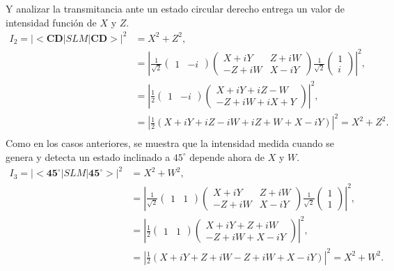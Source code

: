 Y analizar la transmitancia ante un estado circular derecho entrega un
valor de intensidad función de $X$ y $Z$.
\begin{align*}
I_2 = |<\mathbf{CD}|SLM|\mathbf{CD}>|^2 &= X^2+Z^2,\\
&=  \left|\frac{1}{\sqrt{2}}\begin{pmatrix} 1&-i\end{pmatrix} 
       \begin{pmatrix}
         X+iY & Z+iW \\-Z+iW & X-iY
       \end{pmatrix} \frac{1}{\sqrt{2}}\begin{pmatrix}1\\i\end{pmatrix}\right|^2 ,\\
&=  \left|\frac{1}{2}\begin{pmatrix} 1&-i\end{pmatrix} 
       \begin{pmatrix} X+iY +iZ-W\\-Z+iW +iX+Y\end{pmatrix} \right|^2 ,\\
&=  \left|\frac{1}{2}\left(X+iY+iZ-iW+iZ+W+X-iY\right)\right|^2 =  X^2+Z^2.\\
\end{align*}
Como en los casos anteriores, se muestra que la intensidad medida
cuando se genera y detecta un estado inclinado a $45^{\circ}$ depende
ahora de $X$ y $W$.
\begin{align*}
I_3 = |<\mathbf{45^{\circ}}|SLM|\mathbf{45^{\circ}}>|^2 &= X^2+W^2,\\
&=  \left|\frac{1}{\sqrt{2}}\begin{pmatrix} 1&1\end{pmatrix} 
       \begin{pmatrix}
         X+iY & Z+iW \\-Z+iW & X-iY
       \end{pmatrix} \frac{1}{\sqrt{2}}\begin{pmatrix}1\\1\end{pmatrix}\right|^2 ,\\
&=  \left|\frac{1}{2}\begin{pmatrix} 1&1\end{pmatrix} 
       \begin{pmatrix} X+iY +Z+iW\\-Z+iW +X-iY\end{pmatrix} \right|^2, \\
&=  \left|\frac{1}{2}\left(X+iY+Z+iW-Z+iW+X-iY\right)\right|^2 =  X^2+W^2.\\
\end{align*}
